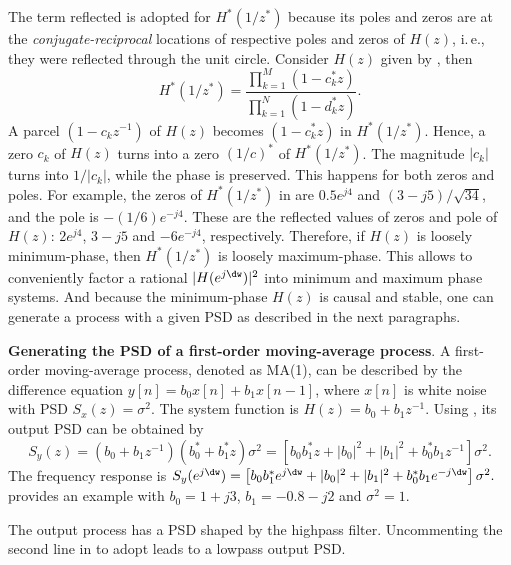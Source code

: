 The term reflected is adopted for $H^*(1/z^{*})$ because its poles and zeros are at the \emph{conjugate-reciprocal} locations of respective poles and zeros of $H(z)$, i.\,e., they were reflected through the unit circle. Consider $H(z)$ given by , then 
\begin{equation}
H^*(1/z^{*}) = \frac{ \prod_{k=1}^M (1-c_k^* z)}{\prod_{k=1}^N (1-d_k^*  z)}.
\end{equation}
A parcel $(1-c_k z^{-1})$ of $H(z)$ becomes $(1-c_k^* z)$ in $H^*(1/z^{*})$. Hence, a zero $c_k$ of $H(z)$ turns into a zero $(1/c)^*$ of $H^*(1/z^{*})$. The magnitude $|c_k|$ turns into $1/|c_k|$, while the phase is preserved. This  happens for both zeros and poles.
For example, the zeros of $H^*(1/z^{*})$ in  are $0.5 e^{j4}$ and $(3-j5)/\sqrt{34}$, and the pole is $-(1/6)e^{-j4}$. These are the reflected values of zeros and pole of $H(z)$: $2 e^{j4}$, $3-j5$ and $-6e^{-j4}$, respectively. Therefore, if $H(z)$ is loosely minimum-phase, then $H^*(1/z^{*})$ is loosely maximum-phase.
This allows to conveniently factor a rational $|H(e^{j\dw})|^2$ into minimum and maximum phase systems. And because the minimum-phase $H(z)$ is causal and stable, one can generate a process with a given PSD as described in the next paragraphs.

\bExample \textbf{Generating the PSD of a first-order moving-average process}.
\label{ex:ma1Example}
A first-order moving-average process, 
denoted as MA(1), can be described by the difference equation $y[n]=b_0 x[n] + b_1 x[n-1]$,
where $x[n]$ is white noise with PSD $S_x(z)=\sigma^2$. The system function is $H(z)=b_0 + b_1 z^{-1}$. Using , its output PSD can be obtained by
\begin{equation}
S_y(z) = (b_0 + b_1 z^{-1}) (b_0^* + b_1^* z) \sigma^2 = \left[b_0 b_1^* z + |b_0|^2 + |b_1|^2 + b_0^* b_1 z^{-1}\right] \sigma^2.
\end{equation}
The frequency response is $S_y(e^{j\dw}) = \left[b_0 b_1^* e^{j\dw} + |b_0|^2 + |b_1|^2 + b_0^* b_1 e^{-j\dw}\right] \sigma^2.$
 provides an example with $b_0=1+j3$, $b_1=-0.8-j2$ and $\sigma^2=1$.



The output process has a PSD shaped by the highpass filter. Uncommenting the second line in  to adopt  leads to a lowpass output PSD.

